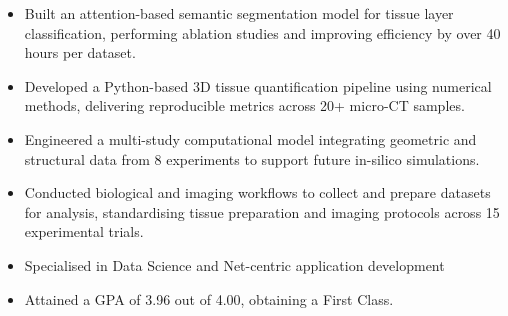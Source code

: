 \documentclass[12pt,a4paper,withhyper]{altacv}
\begin{document}
\begin{itemize}
    \item Built an attention-based semantic segmentation model for tissue layer classification, performing ablation studies and improving efficiency by over 40 hours per dataset.
    \item Developed a Python-based 3D tissue quantification pipeline using numerical methods, delivering reproducible metrics across 20+ micro-CT samples.
    \item Engineered a multi-study computational model integrating geometric and structural data from 8 experiments to support future in-silico simulations.
    \item Conducted biological and imaging workflows to collect and prepare datasets for analysis, standardising tissue preparation and imaging protocols across 15 experimental trials.
\end{itemize}

\divider{}

\begin{itemize}
    \item Specialised in Data Science and Net-centric application development
    \item Attained a GPA of 3.96 out of 4.00, obtaining a First Class.
\end{itemize}
\end{document}
